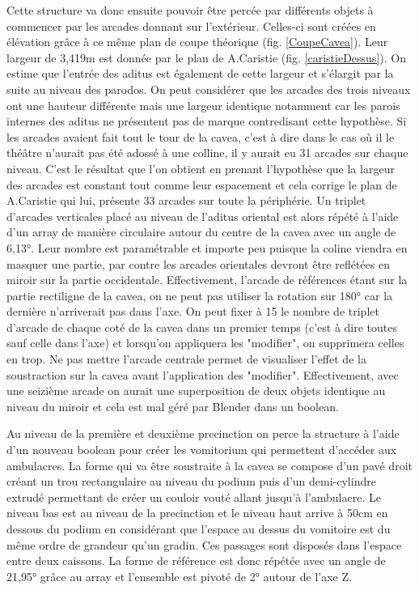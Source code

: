 Cette structure va donc ensuite pouvoir être percée par différents objets à commencer par les arcades donnant sur l'extérieur. Celles-ci sont créées en élévation grâce à ce même plan de coupe théorique (fig. \ref{CoupeCavea}). Leur largeur de 3,419m est donnée par le plan de A.Caristie (fig. \ref{caristieDessus}). On estime que l'entrée des \gls{aditus} est également de cette largeur et s'élargit par la suite au niveau des \gls{parodos}. On peut considérer que les arcades des trois niveaux ont une hauteur différente mais une largeur identique notamment car les parois internes des \gls{aditus} ne présentent pas de marque contredisant cette hypothèse. Si les arcades avaient fait tout le tour de la cavea, c'est à dire dans le cas où il le théâtre n'aurait pas été adossé à une colline, il y aurait eu 31 arcades sur chaque niveau. C'est le résultat que l'on obtient en prenant l'hypothèse que la largeur des arcades est constant tout comme leur espacement et cela corrige le plan de A.Caristie qui lui, présente 33 arcades sur toute la périphérie. Un triplet d'arcades verticales placé au niveau de l'aditus oriental est alors répété à l'aide d'un \gls{array} de manière circulaire autour du centre de la cavea avec un angle de 6,13°. Leur nombre est paramétrable et importe peu puisque la coline viendra en masquer une partie, par contre les arcades orientales devront être reflétées en miroir sur la partie occidentale. Effectivement, l'arcade de références étant sur la partie rectiligne de la cavea, on ne peut pas utiliser la rotation sur 180° car la dernière n'arriverait pas dans l'axe. On peut fixer à 15 le nombre de triplet d'arcade de chaque coté de la cavea dans un premier temps (c'est à dire toutes sauf celle dans l'axe) et lorsqu'on appliquera les "modifier", on supprimera celles en trop. Ne pas mettre l'arcade centrale permet de visualiser l'effet de la soustraction sur la cavea avant l'application des "modifier". Effectivement, avec une seizième arcade on aurait une superposition de deux objets identique au niveau du miroir et cela est mal géré par Blender dans un \gls{boolean}. 

 Au niveau de la première et deuxième \gls{precinction} on perce la structure à l'aide d'un nouveau \gls{boolean} pour créer les \gls{vomitorium} qui permettent d'accéder aux ambulacres. La forme qui va être soustraite à la cavea se compose d'un pavé droit créant un trou rectangulaire au niveau du podium puis d'un demi-cylindre extrudé permettant de créer un couloir vouté allant jusqu'à l'ambulacre. Le niveau bas est au niveau de la \gls{precinction} et le niveau haut arrive à 50cm en dessous du podium en considérant que l'espace au dessus du vomitoire est du même ordre de grandeur qu'un gradin. Ces passages sont disposés dans l'espace entre deux caissons. La forme de référence est donc répétée avec un angle de 21,95° grâce au \gls{array} et l'ensemble est pivoté de 2° autour de l'axe Z. 

